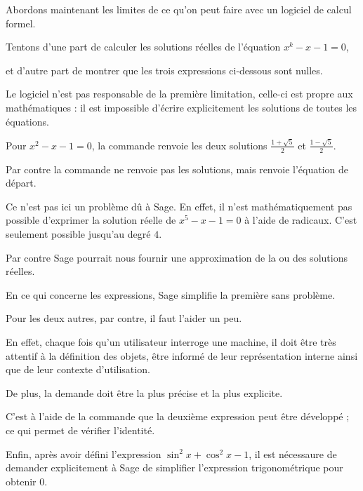 \diapo

Abordons maintenant les limites de ce qu'on peut faire 
avec un logiciel de calcul formel. 


Tentons d'une part de calculer les solutions réelles de 
l'équation $x^k-x-1=0$, 

et d'autre part de montrer que les trois expressions 
ci-dessous sont nulles.

\change

Le logiciel n'est pas responsable de la première limitation, celle-ci est propre aux mathématiques : 
il est impossible d'écrire explicitement les solutions de toutes les équations.

Pour $x^2-x-1=0$, la commande
 renvoie les deux solutions
$\frac{1+\sqrt5}{2}$ et $\frac{1-\sqrt5}{2}$.

\change
Par contre la commande  
ne renvoie pas les solutions, 
mais renvoie l'équation de départ.

Ce n'est pas ici un problème dû à Sage.
En effet, il n'est mathématiquement pas possible d'exprimer 
la solution réelle de $x^5-x-1=0$ 
à l'aide de radicaux. 
C'est seulement possible jusqu'au degré $4$.

Par contre Sage pourrait nous fournir une approximation 
de la ou des solutions réelles.

\change
En ce qui concerne les expressions, Sage simplifie la première sans problème. 

Pour les deux autres, par contre, il faut l'aider un peu.

En effet, chaque fois qu'un utilisateur interroge une machine, 
il doit être très attentif à la définition des objets, 
être informé de leur représentation interne ainsi que 
de leur contexte d'utilisation. 

De plus, la demande doit être la plus précise et la plus explicite.

\change

C'est à l'aide de la commande  
que la deuxième expression peut être développé ;
ce qui permet de vérifier l'identité.

\change

Enfin, après avoir défini l'expression $\sin^2 x+\cos^2 x-1$, 
il est nécessaure de demander explicitement à Sage de 
simplifier l'expression trigonométrique pour obtenir $0$.



% 
% 
% 
% 

